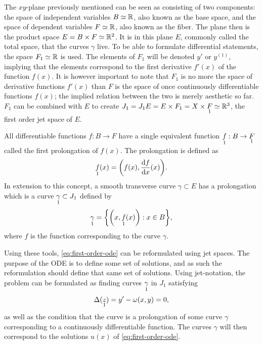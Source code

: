 The \(xy\)-plane previously mentioned can be seen as consisting of two components: the space of independent variables \(B \simeq \reals\), also known as the base space, and the space of dependent variables \(F \simeq \reals\), also known as the fiber.
The plane then is the product space \(E = B \times F \simeq \reals^2\).
It is in this plane \(E\), commonly called the total space, that the curves \(\gamma\) live.
To be able to formulate differential statements, the space \(F_1 \simeq \reals\) is used.
The elements of \(F_1\) will be denoted \(y'\) or \(y^{(1)}\), implying that the elements correspond to the first derivative \(f'(x)\) of the function \(f(x)\).
It is however important to note that \(F_1\) is no more the space of derivative functions \(f'(x)\) than \(F\) is the space of once continuously differentiable functions \(f(x)\); the implied relation between the two is merely aesthetic so far.
\(F_1\) can be combined with \(E\) to create \(J_1 = J_1 E = E \times F_1 = X \times \prolong{F}{1} \simeq \reals^3\), the first order jet space of \(E\).

All differentiable functions \(f: B \to F\) have a single equivalent function \(\prolong{f}{1}: B \to \prolong{F}{1}\) called the first prolongation of \(f(x)\).
The prolongation is defined as
\begin{equation}
  \prolong{f}{1}(x) = \qty(f(x), \diff{f}{x}\relax(x)).
\end{equation}
In extension to this concept, a smooth transverse curve \(\gamma \subset E\) has a prolongation which is a curve \(\prolong{\gamma}{1} \subset J_1\) defined by
\begin{equation}
  \prolong{\gamma}{1} = \qty{\qty(x, \prolong{f}{1}(x)): x \in B},
\end{equation}
where \(f\) is the function corresponding to the curve \(\gamma\).

Using these tools, \cref{eq:first-order-ode} can be reformulated using jet spaces.
The purpose of the ODE is to define some set of solutions, and as such the reformulation should define that same set of solutions.
Using jet-notation, the problem can be formulated as finding curves \(\prolong{\gamma}{1}\) in \(J_1\) satisfying
\begin{equation} \label{eq:first-order-jet-ode}
  \Delta(\prolong{z}{1}) = y' - \omega(x,y) = 0,
\end{equation}
as well as the condition that the curve is a prolongation of some curve \(\gamma\) corresponding to a continuously differentiable function.
The curves \(\gamma\) will then correspond to the solutions \(u(x)\) of \cref{eq:first-order-ode}.

